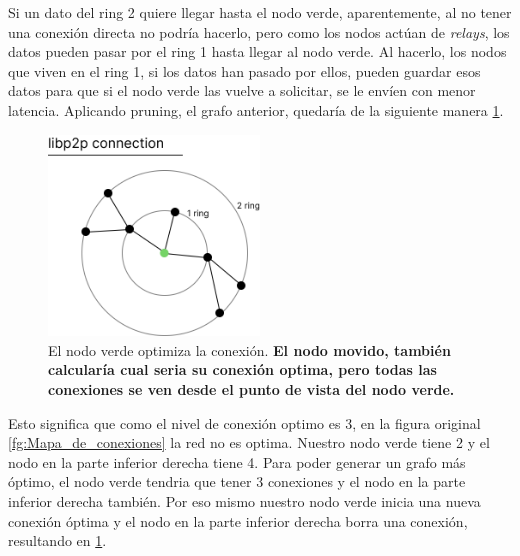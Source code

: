 Si un dato del ring 2 quiere llegar hasta el nodo verde, aparentemente, al no tener una conexión directa no podría hacerlo, pero como los nodos actúan de \textit{relays}, los datos pueden pasar por el ring 1 hasta llegar al nodo verde.
Al hacerlo, los nodos que viven en el ring 1, si los datos han pasado por ellos, pueden guardar esos datos para que si el nodo verde las vuelve a solicitar, se le envíen con menor latencia.
Aplicando pruning, el grafo anterior, quedaría de la siguiente manera \ref{fg:mapa_optimizado}.
\begin{figure}[h!]
    \centering
    \includegraphics[width=0.5\textwidth]{Figures/Radios de comunicacion optimizado.png}
    \caption[El nodo verde optimiza la conexión]{El nodo verde optimiza la conexión. \textbf{El nodo movido, también calcularía cual seria su conexión optima, pero todas las conexiones se ven desde el punto de vista del nodo verde.}}
    \label{fg:mapa_optimizado}
\end{figure}
Esto significa que como el nivel de conexión optimo es 3, en la figura original \ref{fg:Mapa_de_conexiones} la red no es optima. Nuestro nodo verde tiene 2 y el nodo en la parte inferior derecha tiene 4. Para poder generar un grafo más óptimo, el nodo verde tendria que tener 3 conexiones y el nodo en la parte inferior derecha también. Por eso mismo nuestro nodo verde inicia una nueva conexión óptima y el nodo en la parte inferior derecha borra una conexión, resultando en \ref{fg:mapa_optimizado}.
